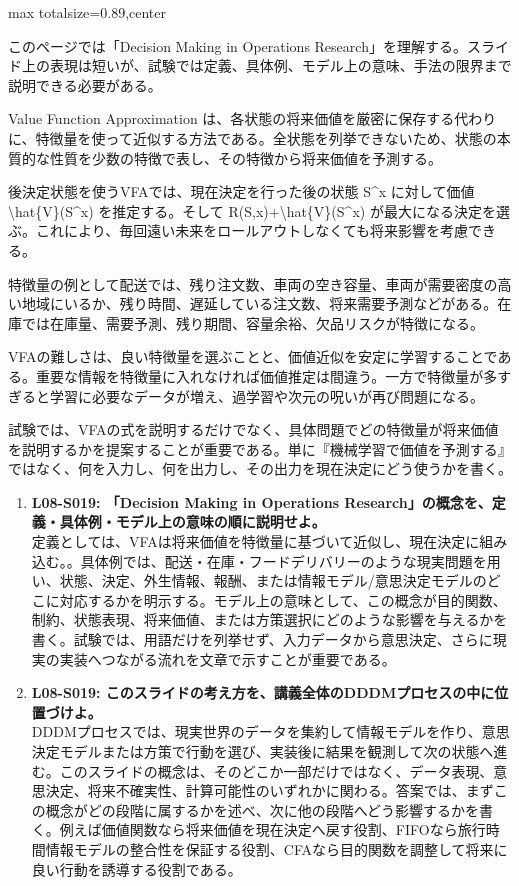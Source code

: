 \begin{minipage}[t]{0.58\textwidth}
\begin{adjustbox}{max totalsize={\textwidth}{0.89\textheight},center}
\begin{minipage}{\textwidth}\scriptsize
{}このページでは「Decision Making in Operations Research」を理解する。スライド上の表現は短いが、試験では定義、具体例、モデル上の意味、手法の限界まで説明できる必要がある。\par
Value Function Approximation は、各状態の将来価値を厳密に保存する代わりに、特徴量を使って近似する方法である。全状態を列挙できないため、状態の本質的な性質を少数の特徴で表し、その特徴から将来価値を予測する。\par
後決定状態を使うVFAでは、現在決定を行った後の状態 S\textasciicircum{}x に対して価値 \textbackslash{}hat\{V\}(S\textasciicircum{}x) を推定する。そして R(S,x)+\textbackslash{}hat\{V\}(S\textasciicircum{}x) が最大になる決定を選ぶ。これにより、毎回遠い未来をロールアウトしなくても将来影響を考慮できる。\par
特徴量の例として配送では、残り注文数、車両の空き容量、車両が需要密度の高い地域にいるか、残り時間、遅延している注文数、将来需要予測などがある。在庫では在庫量、需要予測、残り期間、容量余裕、欠品リスクが特徴になる。\par
VFAの難しさは、良い特徴量を選ぶことと、価値近似を安定に学習することである。重要な情報を特徴量に入れなければ価値推定は間違う。一方で特徴量が多すぎると学習に必要なデータが増え、過学習や次元の呪いが再び問題になる。\par
試験では、VFAの式を説明するだけでなく、具体問題でどの特徴量が将来価値を説明するかを提案することが重要である。単に『機械学習で価値を予測する』ではなく、何を入力し、何を出力し、その出力を現在決定にどう使うかを書く。\par{}\begin{enumerate}\item \textbf{L08-S019: 「Decision Making in Operations Research」の概念を、定義・具体例・モデル上の意味の順に説明せよ。}\\定義としては、VFAは将来価値を特徴量に基づいて近似し、現在決定に組み込む。。具体例では、配送・在庫・フードデリバリーのような現実問題を用い、状態、決定、外生情報、報酬、または情報モデル/意思決定モデルのどこに対応するかを明示する。モデル上の意味として、この概念が目的関数、制約、状態表現、将来価値、または方策選択にどのような影響を与えるかを書く。試験では、用語だけを列挙せず、入力データから意思決定、さらに現実の実装へつながる流れを文章で示すことが重要である。\item \textbf{L08-S019: このスライドの考え方を、講義全体のDDDMプロセスの中に位置づけよ。}\\DDDMプロセスでは、現実世界のデータを集約して情報モデルを作り、意思決定モデルまたは方策で行動を選び、実装後に結果を観測して次の状態へ進む。このスライドの概念は、そのどこか一部だけではなく、データ表現、意思決定、将来不確実性、計算可能性のいずれかに関わる。答案では、まずこの概念がどの段階に属するかを述べ、次に他の段階へどう影響するかを書く。例えば価値関数なら将来価値を現在決定へ戻す役割、FIFOなら旅行時間情報モデルの整合性を保証する役割、CFAなら目的関数を調整して将来に良い行動を誘導する役割である。\end{enumerate}

\end{minipage}
\end{adjustbox}
\end{minipage}
